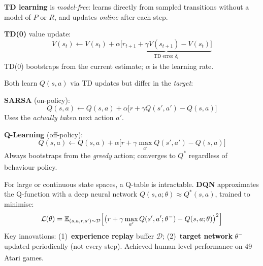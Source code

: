     \begin{tcbitemize}[ skin=sectionraster ]

        \tcbitem[title=Temporal Difference Learning, raster multicolumn=3]
        \textbf{TD learning} is \emph{model-free}: learns directly from
        sampled transitions without a model of $P$ or $R$, and updates
        \emph{online} after each step.

        \textbf{TD(0)} value update:
        \begin{equation}
            V(s_t) \leftarrow V(s_t) + \alpha
            \underbrace{\bigl[r_{t+1} + \gamma V(s_{t+1}) - V(s_t)\bigr]}_{\text{TD error }\delta_t}
        \end{equation}
        TD(0) bootstraps from the current estimate; $\alpha$ is the learning
        rate.\textsuperscript{\cite[][p.~343]{hurbansGrokkingArtificialIntelligence2020}}

        \tcbitem[title={SARSA vs.\ Q-Learning}, raster multicolumn=3]
        Both learn $Q(s,a)$ via TD updates but differ in the \emph{target}:

        \textbf{SARSA} (on-policy):
        \begin{equation}
            Q(s,a) \leftarrow Q(s,a) + \alpha\bigl[r + \gamma Q(s',a') - Q(s,a)\bigr]
        \end{equation}
        Uses the \emph{actually taken} next action $a'$.

        \textbf{Q-Learning} (off-policy):
        \begin{equation}
            Q(s,a) \leftarrow Q(s,a) + \alpha\bigl[r + \gamma \max_{a'} Q(s',a') - Q(s,a)\bigr]
        \end{equation}
        Always bootstraps from the \emph{greedy} action; converges to
        $Q^*$ regardless of behaviour
        policy.\textsuperscript{\cite[][p.~346]{hurbansGrokkingArtificialIntelligence2020}}

        \tcbitem[title={Deep Q-Networks (DQN)}, raster multicolumn=6]
        For large or continuous state spaces, a Q-table is intractable.
        \textbf{DQN} approximates the Q-function with a deep neural network
        $Q(s,a;\theta) \approx Q^*(s,a)$, trained to minimise:
        \begin{equation}
            \mathcal{L}(\theta) = \mathbb{E}_{(s,a,r,s') \sim \mathcal{D}}
            \Bigl[\bigl(r + \gamma \max_{a'} Q(s',a';\theta^-) - Q(s,a;\theta)\bigr)^2\Bigr]
        \end{equation}
        Key innovations: (1)~\textbf{experience replay} buffer $\mathcal{D}$;
        (2)~\textbf{target network} $\theta^-$ updated periodically (not every
        step). Achieved human-level performance on 49 Atari
        games.\textsuperscript{\cite[][p.~350]{hurbansGrokkingArtificialIntelligence2020}}


\end{tcbitemize}
